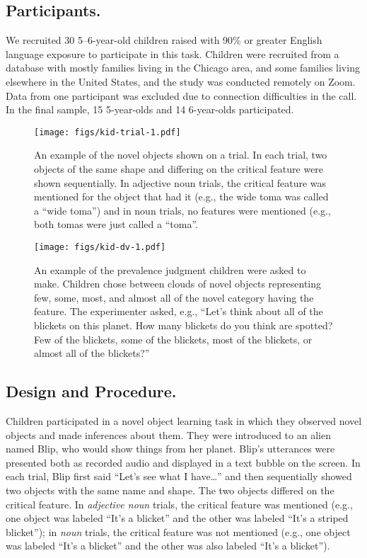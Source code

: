 \documentclass{ucetd}
\begin{document}
\hypertarget{participants.-2}{%
\subsection{Participants.}\label{participants.-2}}

We recruited 30 5--6-year-old children raised with 90\% or greater
English language exposure to participate in this task. Children were
recruited from a database with mostly families living in the Chicago
area, and some families living elsewhere in the United States, and the
study was conducted remotely on Zoom. Data from one participant was
excluded due to connection difficulties in the call. In the final
sample, 15 5-year-olds and 14 6-year-olds participated.

\begin{figure}
\centering
\texttt{[image: figs/kid-trial-1.pdf]}
\caption{An example of the novel objects shown on a trial. In each
trial, two objects of the same shape and differing on the critical
feature were shown sequentially. In adjective noun trials, the critical
feature was mentioned for the object that had it (e.g., the wide toma
was called a ``wide toma'') and in noun trials, no features were
mentioned (e.g., both tomas were just called a ``toma''.}
\end{figure}

\begin{figure}
\centering
\texttt{[image: figs/kid-dv-1.pdf]}
\caption{An example of the prevalence judgment children were asked to
make. Children chose between clouds of novel objects representing few,
some, most, and almost all of the novel category having the feature. The
experimenter asked, e.g., ``Let's think about all of the blickets on
this planet. How many blickets do you think are spotted? Few of the
blickets, some of the blickets, most of the blickets, or almost all of
the blickets?''}
\end{figure}

\hypertarget{design-and-procedure.}{%
\subsection{Design and Procedure.}\label{design-and-procedure.}}

Children participated in a novel object learning task in which they
observed novel objects and made inferences about them. They were
introduced to an alien named Blip, who would show things from her
planet. Blip's utterances were presented both as recorded audio and
displayed in a text bubble on the screen. In each trial, Blip first said
``Let's see what I have\ldots{}'' and then sequentially showed two
objects with the same name and shape. The two objects differed on the
critical feature. In \emph{adjective noun} trials, the critical feature
was mentioned (e.g., one object was labeled ``It's a blicket'' and the
other was labeled ``It's a striped blicket''); in \emph{noun} trials,
the critical feature was not mentioned (e.g., one object was labeled
``It's a blicket'' and the other was also labeled ``It's a blicket'').
\end{document}
